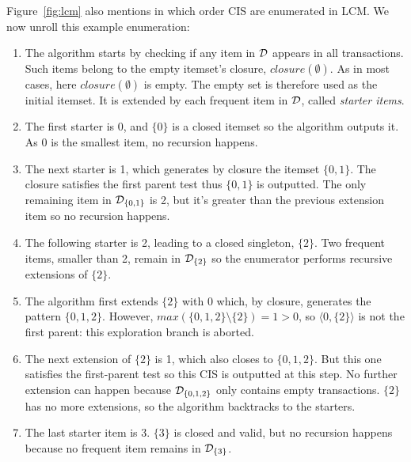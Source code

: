 

Figure~\ref{fig:lcm} also mentions in which order CIS are enumerated in LCM.
We now unroll this example enumeration:

\begin{enumerate}
	\item The algorithm starts by checking if any item in ${\cal D}$ appears in all transactions.
	Such items belong to the empty itemset's closure, $\mathit{closure(\emptyset)}$.
	As in most cases, here $\mathit{closure(\emptyset)}$ is empty.
	The empty set is therefore used as the initial itemset.
	It is extended by each frequent item in ${\cal D}$, called \textit{starter items}.

	\item The first starter is $0$, and $\{0\}$ is a closed itemset so the algorithm outputs it.
	As $0$ is the smallest item, no recursion happens.

	\item The next starter is 1, which generates by closure the itemset $\{0,1\}$.
	The closure satisfies the first parent test thus $\{0,1\}$ is outputted.
	The only remaining item in ${\cal D}_{\{0,1\}}$ is 2,
	but it's greater than the previous extension item so no recursion happens.

	\item The following starter is 2, leading to a closed singleton, $\{2\}$.
	Two frequent items, smaller than 2, remain in ${\cal D}_{\{2\}}$
	so the enumerator performs recursive extensions of $\{2\}$.

	\item The algorithm first extends $\{2\}$ with $0$ which, by closure, generates the pattern $\{0,1,2\}$.
	However, $\mathit{max}(\{0,1,2\}\setminus\{2\})=1>0$, so $\langle 0,\{2\}\rangle$ is not the first parent:
	this exploration branch is aborted.

	\item The next extension of $\{2\}$ is 1, which also closes to $\{0,1,2\}$.
	But this one satisfies the first-parent test so this CIS is outputted at this step.
	No further extension can happen because ${\cal D}_{\{0,1,2\}}$ only contains empty transactions.
	$\{2\}$ has no more extensions, so the algorithm backtracks to the starters.

	\item The last starter item is 3. $\{3\}$ is closed and valid,
	but no recursion happens because no frequent item remains in ${\cal D}_{\{3\}}$.
\end{enumerate}













